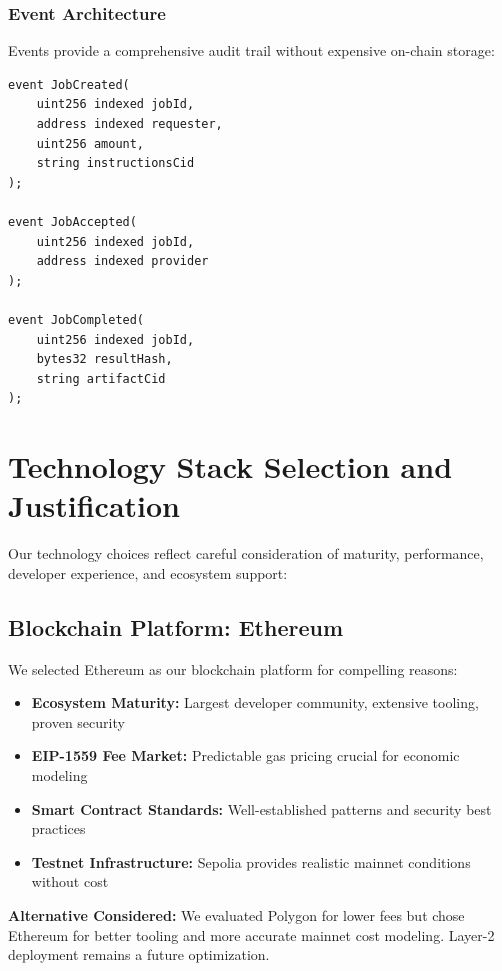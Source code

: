 \subsubsection{Event Architecture}
Events provide a comprehensive audit trail without expensive on-chain storage:
\begin{lstlisting}[language=Solidity, caption=Event definitions for system observability]
event JobCreated(
    uint256 indexed jobId,
    address indexed requester,
    uint256 amount,
    string instructionsCid
);

event JobAccepted(
    uint256 indexed jobId,
    address indexed provider
);

event JobCompleted(
    uint256 indexed jobId,
    bytes32 resultHash,
    string artifactCid
);
\end{lstlisting}

\section{Technology Stack Selection and Justification}

Our technology choices reflect careful consideration of maturity, performance, developer experience, and ecosystem support:

\subsection{Blockchain Platform: Ethereum}

We selected Ethereum as our blockchain platform for compelling reasons:

\begin{itemize}
    \item \textbf{Ecosystem Maturity:} Largest developer community, extensive tooling, proven security
    \item \textbf{EIP-1559 Fee Market:} Predictable gas pricing crucial for economic modeling \citep{roughgarden2021eip1559}
    \item \textbf{Smart Contract Standards:} Well-established patterns and security best practices
    \item \textbf{Testnet Infrastructure:} Sepolia provides realistic mainnet conditions without cost
\end{itemize}

\textbf{Alternative Considered:} We evaluated Polygon for lower fees but chose Ethereum for better tooling and more accurate mainnet cost modeling. Layer-2 deployment remains a future optimization.

